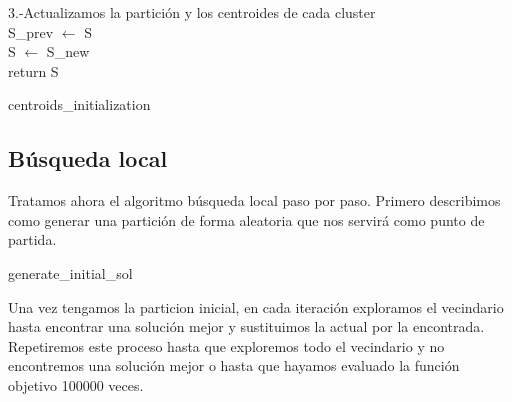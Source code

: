 \documentclass[11pt,a4paper]{article}
\begin{document}
\begin{algorithm}[H]
{{	 	        
	 	        3.-Actualizamos la partición y los centroides de cada cluster\\
	 	        S\_prev $\leftarrow$ S \\
	 	        S $\leftarrow$ S\_new \\
	 	    }
	 		return S \\
	 	}
	\end{algorithm} 
	\clearpage
	\begin{algorithm}[H]
	 	\caption{centroids\_initialization}
	\end{algorithm}
	
	


	\subsection{Búsqueda local}
	
	Tratamos ahora el algoritmo búsqueda local paso por paso. Primero describimos como generar una partición de forma aleatoria que nos servirá como punto de partida. \\
	\begin{algorithm}[H]
	 	\caption{generate\_initial\_sol}
	\end{algorithm}
	Una vez tengamos la particion inicial, en cada iteración exploramos el vecindario hasta encontrar una solución mejor y sustituimos la actual por la encontrada. Repetiremos este proceso hasta que exploremos todo el vecindario y no encontremos una solución mejor o hasta que hayamos evaluado la función objetivo 100000 veces. \\
	
\end{document}

